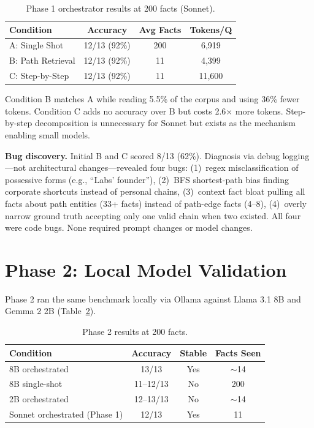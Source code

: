 \documentclass[11pt,a4paper]{article}
\begin{document}
\begin{table}[h]
\centering
\caption{Phase 1 orchestrator results at 200 facts (Sonnet).}
\label{tab:phase1}
\begin{tabular}{@{}lccc@{}}
\toprule
Condition & Accuracy & Avg Facts & Tokens/Q \\
\midrule
A: Single Shot & 12/13 (92\%) & 200 & 6{,}919 \\
B: Path Retrieval & 12/13 (92\%) & 11 & 4{,}399 \\
C: Step-by-Step & 12/13 (92\%) & 11 & 11{,}600 \\
\bottomrule
\end{tabular}
\end{table}

Condition B matches A while reading 5.5\% of the corpus and using 36\% fewer tokens. Condition C adds no accuracy over B but costs 2.6$\times$ more tokens. Step-by-step decomposition is unnecessary for Sonnet but exists as the mechanism enabling small models.

\textbf{Bug discovery.} Initial B and C scored 8/13 (62\%). Diagnosis via debug logging---not architectural changes---revealed four bugs: (1)~regex misclassification of possessive forms (e.g., ``Labs' founder''), (2)~BFS shortest-path bias finding corporate shortcuts instead of personal chains, (3)~context fact bloat pulling all facts about path entities (33+ facts) instead of path-edge facts (4--8), (4)~overly narrow ground truth accepting only one valid chain when two existed. All four were code bugs. None required prompt changes or model changes.

\section{Phase 2: Local Model Validation}
\label{sec:phase2}

Phase 2 ran the same benchmark locally via Ollama against Llama 3.1 8B and Gemma 2 2B (Table~\ref{tab:phase2}).

\begin{table}[h]
\centering
\caption{Phase 2 results at 200 facts.}
\label{tab:phase2}
\begin{tabular}{@{}lccc@{}}
\toprule
Condition & Accuracy & Stable & Facts Seen \\
\midrule
8B orchestrated & 13/13 & Yes & $\sim$14 \\
8B single-shot & 11--12/13 & No & 200 \\
2B orchestrated & 12--13/13 & No & $\sim$14 \\
Sonnet orchestrated (Phase 1) & 12/13 & Yes & 11 \\
\bottomrule
\end{tabular}
\end{table}
\end{document}
